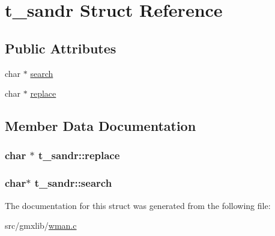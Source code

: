 \hypertarget{structt__sandr}{\section{t\-\_\-sandr \-Struct \-Reference}
\label{structt__sandr}
}
\subsection*{\-Public \-Attributes}
\begin{DoxyCompactItemize}
\item 
char $\ast$ \hyperlink{structt__sandr_a4d23c3989a094f1c8b74a114d471c2f9}{search}
\item 
char $\ast$ \hyperlink{structt__sandr_a3da2b5cd9993e0b705731666d9b7e04b}{replace}
\end{DoxyCompactItemize}


\subsection{\-Member \-Data \-Documentation}
\hypertarget{structt__sandr_a3da2b5cd9993e0b705731666d9b7e04b}{
\subsubsection[{replace}]{\setlength{\rightskip}{0pt plus 5cm}char $\ast$ {\bf t\-\_\-sandr\-::replace}}}\label{structt__sandr_a3da2b5cd9993e0b705731666d9b7e04b}
\hypertarget{structt__sandr_a4d23c3989a094f1c8b74a114d471c2f9}{
\subsubsection[{search}]{\setlength{\rightskip}{0pt plus 5cm}char$\ast$ {\bf t\-\_\-sandr\-::search}}}\label{structt__sandr_a4d23c3989a094f1c8b74a114d471c2f9}


\-The documentation for this struct was generated from the following file\-:\begin{DoxyCompactItemize}
\item 
src/gmxlib/\hyperlink{wman_8c}{wman.\-c}\end{DoxyCompactItemize}
